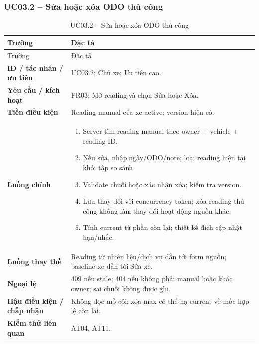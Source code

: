 \subsubsection{UC03.2 -- Sửa hoặc xóa ODO thủ công}\label{uc:UC03.2}
\begin{smalltable}\begin{longtable}{L{3.2cm}L{11.8cm}}
\caption{UC03.2 -- Sửa hoặc xóa ODO thủ công}\label{tab:UC03.2}\\
\toprule Trường & Đặc tả\\\midrule\endfirsthead
\toprule Trường & Đặc tả\\\midrule\endhead
\textbf{ID / tác nhân / ưu tiên} & UC03.2; Chủ xe; Ưu tiên cao.\\
\textbf{Yêu cầu / kích hoạt} & FR03; Mở reading và chọn Sửa hoặc Xóa.\\
\textbf{Tiền điều kiện} & Reading manual của xe active; version hiện có.\\
\textbf{Luồng chính} & \begin{enumerate}[leftmargin=*,nosep]
\item Server tìm reading manual theo owner + vehicle + reading ID.
\item Nếu sửa, nhập ngày/ODO/note; loại reading hiện tại khỏi tập so sánh.
\item Validate chuỗi hoặc xác nhận xóa; kiểm tra version.
\item Lưu thay đổi với concurrency token; xóa reading thủ công không làm thay đổi hoạt động nguồn khác.
\item Tính current từ phần còn lại; thiết kế đích cập nhật hạn/nhắc.
\end{enumerate}\\
\textbf{Luồng thay thế} & Reading từ nhiên liệu/dịch vụ dẫn tới form nguồn; baseline xe dẫn tới Sửa xe.\\
\textbf{Ngoại lệ} & 409 nếu stale; 404 nếu không phải manual hoặc khác owner; sai chuỗi không được ghi.\\
\textbf{Hậu điều kiện / chấp nhận} & Không đọc mồ côi; xóa max có thể hạ current về mốc hợp lệ còn lại.\\
\textbf{Kiểm thử liên quan} & AT04, AT11.\\
\bottomrule\end{longtable}\end{smalltable}
